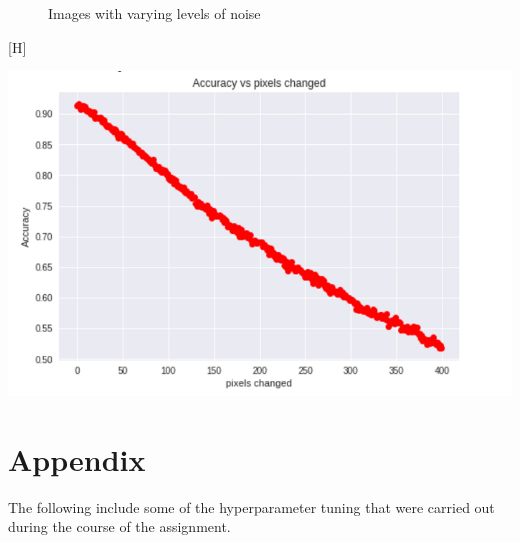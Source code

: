 \documentclass[12pt]{report}
\begin{document}
\begin{figure}[H]
\caption{Images with varying levels of noise}
\end{figure}[H]
 \begin{center}
 \includegraphics[scale=0.5]{fooling.png}
 \end{center}



\newpage
\section{Appendix}
The following include some of the hyperparameter tuning that were carried out during the course of the assignment.
\end{document}
